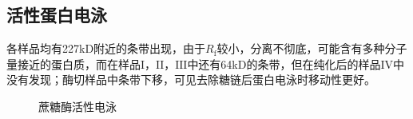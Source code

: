 
\subsection{活性蛋白电泳}
\par 各样品均有227kD附近的条带出现，由于$R_\text{f}$较小，分离不彻底，可能含有多种分子量接近的蛋白质，而在样品$\mathrm{I，II，III}$中还有64kD的条带，但在纯化后的样品$\mathrm{IV}$中没有发现；酶切样品中条带下移，可见去除糖链后蛋白电泳时移动性更好。

\begin{figure}
    \caption{蔗糖酶活性电泳}
    \label{fig:AC}
\end{figure}

